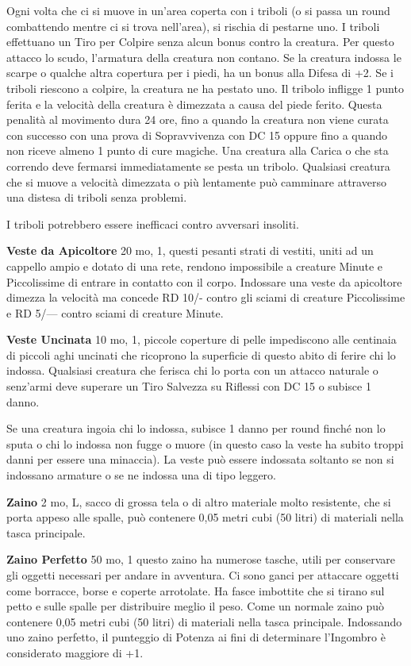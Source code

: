 \documentclass[a4paper,11pt,twoside,openany]{book}
\begin{document}
Ogni volta che ci si muove in un'area coperta con i triboli (o si passa un round combattendo mentre ci si trova nell'area), si rischia di pestarne uno. I triboli effettuano un Tiro per Colpire senza alcun bonus contro la creatura. Per questo attacco lo scudo, l'armatura della creatura non contano. Se la creatura indossa le scarpe o qualche altra copertura per i piedi, ha un bonus alla Difesa di +2. Se i triboli riescono a colpire, la creatura ne ha pestato uno. Il tribolo infligge 1 punto ferita e la velocità della creatura è dimezzata a causa del piede ferito. Questa penalità al movimento dura 24 ore, fino a quando la creatura non viene curata con successo con una prova di Sopravvivenza con DC 15 oppure fino a quando non riceve almeno 1 punto di cure magiche.
Una creatura alla Carica o che sta correndo deve fermarsi immediatamente se pesta un tribolo. Qualsiasi creatura che si muove a velocità dimezzata o più lentamente può camminare attraverso una distesa di triboli senza problemi.

I triboli potrebbero essere inefficaci contro avversari insoliti.

\textbf{Veste da Apicoltore} 20 mo, 1, questi pesanti strati di vestiti, uniti ad un cappello ampio e dotato di una rete, rendono impossibile a creature Minute e Piccolissime di entrare in contatto con il corpo. Indossare una veste da apicoltore dimezza la velocità ma concede RD 10/- contro gli sciami di creature Piccolissime e RD 5/--- contro sciami di creature Minute.

\textbf{Veste Uncinata} 10 mo, 1, piccole coperture di pelle impediscono alle centinaia di piccoli aghi uncinati che ricoprono la superficie di questo abito di ferire chi lo indossa. Qualsiasi creatura che ferisca chi lo porta con un attacco naturale o senz'armi deve superare un Tiro Salvezza su Riflessi con DC 15 o subisce 1 danno.

Se una creatura ingoia chi lo indossa, subisce 1 danno per round finché non lo sputa o chi lo indossa non fugge o muore (in questo caso la veste ha subito troppi danni per essere una minaccia). La veste può essere indossata soltanto se non si indossano armature o se ne indossa una di tipo leggero.

\textbf{Zaino} 2 mo, L, sacco di grossa tela o di altro materiale molto resistente, che si porta appeso alle spalle, può contenere 0,05 metri cubi (50 litri) di materiali nella tasca principale.

\textbf{Zaino Perfetto} 50 mo, 1 questo zaino ha numerose tasche, utili per conservare gli oggetti necessari per andare in avventura. Ci sono ganci per attaccare oggetti come borracce, borse e coperte arrotolate.
Ha fasce imbottite che si tirano sul petto e sulle spalle per distribuire meglio il peso. Come un normale zaino può contenere 0,05 metri cubi (50 litri) di materiali nella tasca principale. Indossando uno zaino perfetto, il punteggio di Potenza ai fini di determinare l'Ingombro è considerato maggiore di +1.
\end{document}
